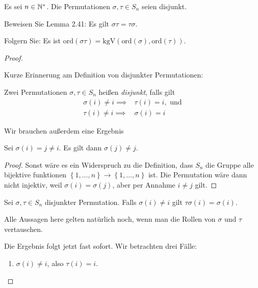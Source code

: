 \begin{Problem}\label{pr:introalgblatt5-2}
	Es sei $n\in \mathbb{N}^*$. Die Permutationen $\sigma, \tau\in S_n$ seien disjunkt.
	\begin{parts}
	\item Beweisen Sie Lemma 2.41: Es gilt $\sigma\tau=\tau\sigma$.
	\item Folgern Sie: Es ist $\text{ord}(\sigma\tau)=\text{kgV}(\text{ord}(\sigma),\text{ord}(\tau))$.
	\end{parts}
\end{Problem}
\begin{proof}
	\begin{parts}
	\item Kurze Erinnerung am Definition von disjunkter Permutationen:
		\begin{tcolorbox}
			\begin{Definition}\label{def:introalgblatt5-1}
			Zwei Permutationen $\sigma,\tau\in S_n$ heißen \emph{disjunkt}, falls gilt
			\begin{align*}
				\sigma(i)\neq i\implies& \tau(i)=i,\text{ und}\\
				\tau(i)\neq i\implies& \sigma(i)=i
			\end{align*}
		\end{Definition}
		\end{tcolorbox}
		Wir brauchen außerdem eine Ergebnis
		\begin{tcolorbox}
			\begin{Lemma}
				Sei $\sigma(i)=j\neq i$. Es gilt dann $\sigma(j)\neq j$.
			\end{Lemma}
			\begin{proof}
				Sonst wäre es ein Widerspruch zu die Definition, dass $S_n$ die Gruppe alle bijektive funktionen $\left\{ 1,\dots, n \right\} \to \left\{ 1, \dots, n \right\} $ ist. Die Permutation wäre dann nicht injektiv, weil $\sigma(i)=\sigma(j)$, aber per Annahme $i\neq j$ gilt.
			\end{proof}
			\begin{Corollary}\label{corollary:introalgblatt5-1}
			Sei $\sigma,\tau\in S_n$ disjunkter Permutation. Falls $\sigma(i)\neq i$ gilt $\tau\sigma\left( i \right) =\sigma(i)$.
			\end{Corollary}
			\begin{Remark}
				Alle Aussagen here gelten natürlich noch, wenn man die Rollen von $\sigma$ und $\tau$ vertauschen.
			\end{Remark}
		\end{tcolorbox}Die Ergebnis folgt jetzt fast sofort. Wir betrachten drei F\"{a}lle:
		\begin{enumerate}[label=(\roman*)]
			\item $\sigma(i)\neq i$, also $\tau(i)=i$.


\end{enumerate}
\end{parts}
\end{proof}
